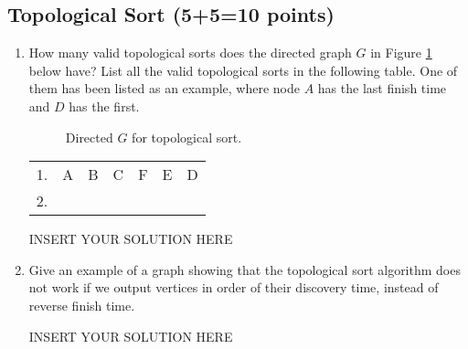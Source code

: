 \subsection{Topological Sort (5+5=10 points)}
\begin{enumerate}
    \item How many valid topological sorts does the directed graph $G$ in Figure \ref{fig:topo-sort} below have? List all the valid topological sorts in the following table. One of them has been listed as an example, where node $A$ has the last finish time and $D$ has the first.

    \begin{figure}[H]
        \centering
        \caption{Directed $G$ for topological sort.}
        \label{fig:topo-sort}
    \end{figure}
    
     \begin{center}
    \begin{tabular}{c c c c c c c}
    \hline
     1. & A & B & C & F & E & D\\
     2. &  &  &  &  &  & \\
    \hline
    \end{tabular}
    \label{table:q3}
    \end{center}
\begin{solution}   INSERT YOUR SOLUTION HERE   \end{solution}
    

    \item 
    Give an example of a graph showing that the topological sort algorithm does not work if we output vertices in order of their discovery time, instead of reverse finish time.

\begin{solution}   INSERT YOUR SOLUTION HERE   \end{solution}
\end{enumerate}




